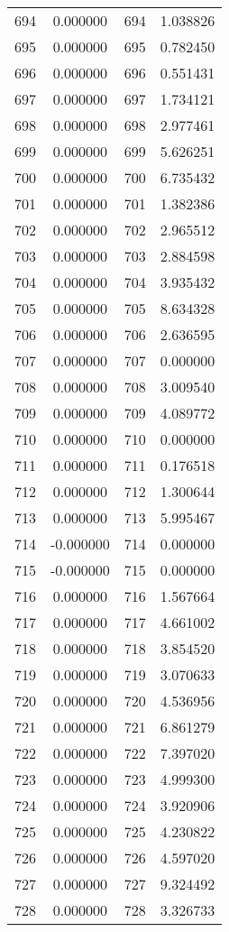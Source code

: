 \documentclass[12pt]{article}
\begin{document}
\begin{longtable}{@{}cccc@{}}
694 & 0.000000 & 694 & 1.038826 \\
695 & 0.000000 & 695 & 0.782450 \\
696 & 0.000000 & 696 & 0.551431 \\
697 & 0.000000 & 697 & 1.734121 \\
698 & 0.000000 & 698 & 2.977461 \\
699 & 0.000000 & 699 & 5.626251 \\
700 & 0.000000 & 700 & 6.735432 \\
701 & 0.000000 & 701 & 1.382386 \\
702 & 0.000000 & 702 & 2.965512 \\
703 & 0.000000 & 703 & 2.884598 \\
704 & 0.000000 & 704 & 3.935432 \\
705 & 0.000000 & 705 & 8.634328 \\
706 & 0.000000 & 706 & 2.636595 \\
707 & 0.000000 & 707 & 0.000000 \\
708 & 0.000000 & 708 & 3.009540 \\
709 & 0.000000 & 709 & 4.089772 \\
710 & 0.000000 & 710 & 0.000000 \\
711 & 0.000000 & 711 & 0.176518 \\
712 & 0.000000 & 712 & 1.300644 \\
713 & 0.000000 & 713 & 5.995467 \\
714 & -0.000000 & 714 & 0.000000 \\
715 & -0.000000 & 715 & 0.000000 \\
716 & 0.000000 & 716 & 1.567664 \\
717 & 0.000000 & 717 & 4.661002 \\
718 & 0.000000 & 718 & 3.854520 \\
719 & 0.000000 & 719 & 3.070633 \\
720 & 0.000000 & 720 & 4.536956 \\
721 & 0.000000 & 721 & 6.861279 \\
722 & 0.000000 & 722 & 7.397020 \\
723 & 0.000000 & 723 & 4.999300 \\
724 & 0.000000 & 724 & 3.920906 \\
725 & 0.000000 & 725 & 4.230822 \\
726 & 0.000000 & 726 & 4.597020 \\
727 & 0.000000 & 727 & 9.324492 \\
728 & 0.000000 & 728 & 3.326733 \\

\end{longtable}
\end{document}
